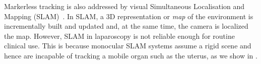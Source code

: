 Markerless tracking is also addressed by visual Simultaneous Localisation and Mapping (SLAM)~\cite{Thrun2002Robotic,Mahmoud2017}. 
In SLAM,  a 3D representation or \textit{map} of the environment is incrementally built and updated and, at the same time, the camera is localized \wrt the map.
However, SLAM in laparoscopy is not reliable enough for routine clinical use. %
This is because monocular SLAM systems assume a rigid scene and hence are incapable of tracking a mobile organ such as the uterus, as we show in .

